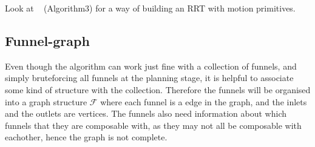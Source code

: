 Look at ~\cite{vonasekGlobalMotionPlanning2013} (Algorithm3) for a way of
building an RRT with motion primitives.

\subsection{Funnel-graph}

Even though the \rrtfunnel{} algorithm can work just fine with a collection of
funnels, and simply bruteforcing all funnels at the planning stage, it is
helpful to associate some kind of structure with the collection. Therefore the
funnels will be organised into a graph structure \(\mathcal{F}\) where each
funnel is a edge in the graph, and the inlets and the outlets are vertices. The
funnels also need information about which funnels that they are composable with,
as they may not all be composable with eachother, hence the graph is not
complete.

